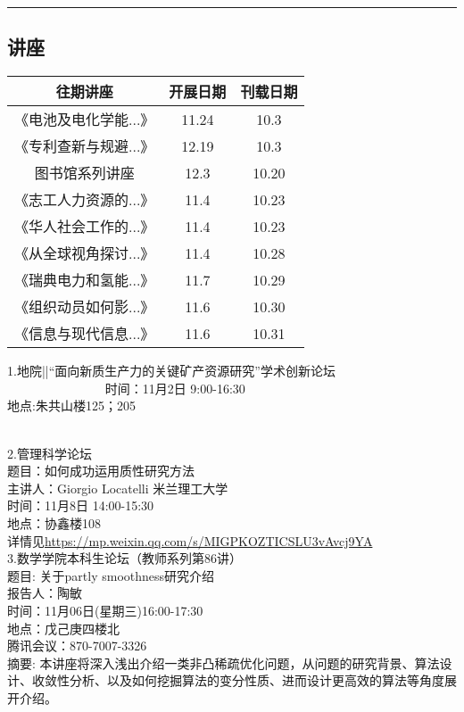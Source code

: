 \documentclass[letterpaper, 12pt]{article}
\begin{document}
\hrule
\pagebreak
\begin{multicols}{2}

\section{讲座}
\begin{tabular}{|c|c|c|}
    \hline
    往期讲座 & 开展日期 & 刊载日期\\
    \hline\hline
    《电池及电化学能...》 & 11.24 & 10.3\\
    《专利查新与规避...》 & 12.19 & 10.3\\
    图书馆系列讲座 & 12.3 & 10.20\\
    《志工人力资源的...》 & 11.4 & 10.23\\
    《华人社会工作的...》 & 11.4 & 10.23\\
    《从全球视角探讨...》 & 11.4 & 10.28\\
    《瑞典电力和氢能...》 & 11.7 & 10.29\\
    《组织动员如何影...》 & 11.6 & 10.30\\
    《信息与现代信息...》 & 11.6 & 10.31\\
    
    \hline
\end{tabular}

1.地院||“面向新质生产力的关键矿产资源研究”学术创新论坛\\               
时间：11月2日 9:00-16:30\\
地点:朱共山楼125；205\\  

2.管理科学论坛\\
题目：如何成功运用质性研究方法\\
主讲人：Giorgio Locatelli 米兰理工大学\\
时间：11月8日 14:00-15:30\\
地点：协鑫楼108\\
详情见\url{https://mp.weixin.qq.com/s/MIGPKOZTICSLU3vAvcj9YA}\\

3.数学学院本科生论坛（教师系列第86讲）\\
题目: 关于partly smoothness研究介绍\\
报告人：陶敏\\
时间：11月06日(星期三)16:00-17:30\\
地点：戊己庚四楼北\\
腾讯会议：870-7007-3326\\
摘要:  本讲座将深入浅出介绍一类非凸稀疏优化问题，从问题的研究背景、算法设计、收敛性分析、以及如何挖掘算法的变分性质、进而设计更高效的算法等角度展开介绍。\\




\end{multicols}
\end{document}
